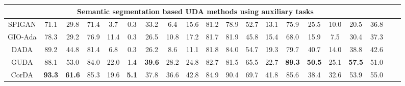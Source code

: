 \documentclass{bmvc2k}
\begin{document}
\begin{table*}[t]
{\begin{tabular}{llllllllllllllllllll}
\hline
\multicolumn{18}{c}{Semantic segmentation based UDA methods using auxiliary tasks} &  \\
\hline
\multicolumn{1}{c|}{SPIGAN\cite{Lee2019SPIGANPA}} & \multicolumn{1}{c}{71.1} & \multicolumn{1}{c}{29.8} & \multicolumn{1}{c}{71.4} & \multicolumn{1}{c}{3.7} & \multicolumn{1}{c}{0.3} & \multicolumn{1}{c}{33.2} & \multicolumn{1}{c}{6.4} & \multicolumn{1}{c}{15.6} & \multicolumn{1}{c}{81.2} & \multicolumn{1}{c}{78.9} & \multicolumn{1}{c}{52.7} & \multicolumn{1}{c}{13.1} & \multicolumn{1}{c}{75.9} & \multicolumn{1}{c}{25.5} & \multicolumn{1}{c}{10.0} & \multicolumn{1}{c|}{20.5} &  \multicolumn{1}{c}{36.8} \\
\multicolumn{1}{c|}{GIO-Ada\cite{Chen_2019_GIOada}} & \multicolumn{1}{c}{78.3} & \multicolumn{1}{c}{29.2} & \multicolumn{1}{c}{76.9} & \multicolumn{1}{c}{11.4} & \multicolumn{1}{c}{0.3} & \multicolumn{1}{c}{26.5} & \multicolumn{1}{c}{10.8} & \multicolumn{1}{c}{17.2} & \multicolumn{1}{c}{81.7} & \multicolumn{1}{c}{81.9} & \multicolumn{1}{c}{45.8} & \multicolumn{1}{c}{15.4} & \multicolumn{1}{c}{68.0} & \multicolumn{1}{c}{15.9} & \multicolumn{1}{c}{7.5} & \multicolumn{1}{c|}{30.4} &  \multicolumn{1}{c}{37.3} \\
\multicolumn{1}{c|}{DADA\cite{vu2019dada}} & \multicolumn{1}{c}{89.2} & \multicolumn{1}{c}{44.8} & \multicolumn{1}{c}{81.4} & \multicolumn{1}{c}{6.8} & \multicolumn{1}{c}{0.3} & \multicolumn{1}{c}{26.2} & \multicolumn{1}{c}{8.6} & \multicolumn{1}{c}{11.1} & \multicolumn{1}{c}{81.8} & \multicolumn{1}{c}{84.0} & \multicolumn{1}{c}{54.7} & \multicolumn{1}{c}{19.3} & \multicolumn{1}{c}{79.7} & \multicolumn{1}{c}{40.7} & \multicolumn{1}{c}{14.0} & \multicolumn{1}{c|}{38.8} &  \multicolumn{1}{c}{42.6} \\
\multicolumn{1}{c|}{GUDA\cite{guizilini2021geometric}} & \multicolumn{1}{c}{88.1} & \multicolumn{1}{c}{53.0} & \multicolumn{1}{c}{84.0} & \multicolumn{1}{c}{22.0} & \multicolumn{1}{c}{1.4} & \multicolumn{1}{c}{\textbf{39.6}} & \multicolumn{1}{c}{28.2} & \multicolumn{1}{c}{24.8} & \multicolumn{1}{c}{82.7} & \multicolumn{1}{c}{81.5} & \multicolumn{1}{c}{65.5} & \multicolumn{1}{c}{22.7} & \multicolumn{1}{c}{\textbf{89.3}} & \multicolumn{1}{c}{\textbf{50.5}} & \multicolumn{1}{c}{25.1} & \multicolumn{1}{c|}{\textbf{57.5}} &  \multicolumn{1}{c}{51.0} \\
\multicolumn{1}{c|}{CorDA\cite{wang2021domain}} & \multicolumn{1}{c}{\textbf{93.3}} & \multicolumn{1}{c}{\textbf{61.6}} & \multicolumn{1}{c}{85.3} & \multicolumn{1}{c}{19.6} & \multicolumn{1}{c}{\textbf{5.1}} & \multicolumn{1}{c}{37.8} & \multicolumn{1}{c}{36.6} & \multicolumn{1}{c}{42.8} & \multicolumn{1}{c}{84.9} & \multicolumn{1}{c}{90.4} & \multicolumn{1}{c}{69.7} & \multicolumn{1}{c}{41.8} & \multicolumn{1}{c}{85.6} & \multicolumn{1}{c}{38.4} & \multicolumn{1}{c}{32.6} & \multicolumn{1}{c|}{53.9} &  \multicolumn{1}{c}{55.0} \\

\end{tabular}}
\end{table*}
\end{document}
